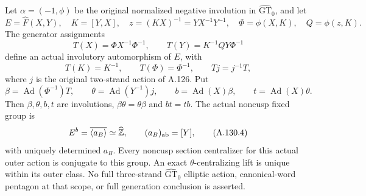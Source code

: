 Let \(\alpha=(-1,\phi)\) be the original normalized negative
involution in \(\widehat{\mathrm{GT}}_0\), and let
\[
 E=\widehat F(X,Y),\quad K=[Y,X],\quad
 z=(KX)^{-1}=YX^{-1}Y^{-1},\quad
 \Phi=\phi(X,K),\quad Q=\phi(z,K).
\]
The generator assignments
\[
 T(X)=\Phi X^{-1}\Phi^{-1},\qquad
 T(Y)=K^{-1}QY\Phi^{-1}                                     \tag{A.130.1}
\]
define an actual involutory automorphism of \(E\), with
\[
 T(K)=K^{-1},\qquad T(\Phi)=\Phi^{-1},\qquad Tj=j^{-1}T,       \tag{A.130.2}
\]
where \(j\) is the original two-strand action of A.126.
Put
\[
 \beta=\operatorname{Ad}(\Phi^{-1})T,\qquad
 \theta=\operatorname{Ad}(Y^{-1})j,\qquad
 b=\operatorname{Ad}(X)\beta,\qquad
 t=\operatorname{Ad}(X)\theta .
                                                               \tag{A.130.3}
\]
Then \(\beta,\theta,b,t\) are involutions, \(\beta\theta=\theta\beta\)
and \(bt=tb\). The actual noncusp fixed group is
\[
          E^b=\overline{\langle a_B\rangle}
                \simeq\widehat{\mathbb Z},\qquad
          (a_B)_{\rm ab}=[Y],                               \tag{A.130.4}
\]
with uniquely determined \(a_B\). Every noncusp section centralizer
for this actual outer action is conjugate to this group.
An exact \(\theta\)-centralizing lift is unique within its outer
class. No full three-strand \(\widehat{\mathrm{GT}}_0\) elliptic
action, canonical-word pentagon at that scope, or full generation
conclusion is asserted.

